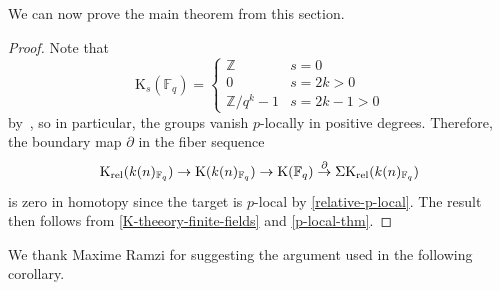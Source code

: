\documentclass[english,10pt]{amsart}
\theoremstyle{definition}
\numberwithin{equation}{section}
\begin{document}
We can now  prove the main theorem from this section. 
\mainthmcardinality*
\begin{proof}
Note that 
\[ 
\mathrm{K}_s(\mathbb{F}_q)=\begin{cases} \mathbb{Z} & s=0 \\
0 &  s=2k>0\\
\mathbb{Z}/q^{k}-1 & s=2k-1> 0 
\end{cases}
\]
by~\cite{Qui72}, so in particular, the groups vanish $p$-locally in positive degrees. Therefore, the boundary map $\partial$ in the fiber sequence 
\begin{equation}\label{K-theeory-finite-fields}
\mathrm{K}_{\textup{rel}}(k(n)_{\mathbb{F}_q})\to \mathrm{K}(k(n)_{\mathbb{F}_q}) \to \mathrm{K}(\mathbb{F}_q)\overset{\partial}{\to} \Sigma\mathrm{K}_{\textup{rel}}(k(n)_{\mathbb{F}_q})
\end{equation}
is zero in homotopy since the target is $p$-local by \autoref{relative-p-local}. The result then follows from \eqref{K-theeory-finite-fields}  and \autoref{p-local-thm}. 
\end{proof}

We thank Maxime Ramzi for suggesting the argument used in the following corollary.
\end{document}
